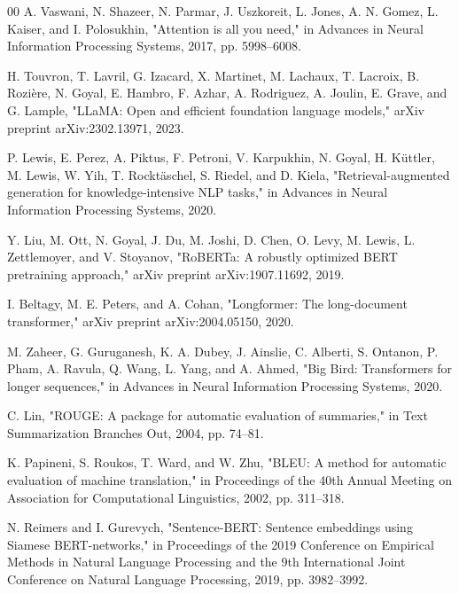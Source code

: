 \documentclass[conference]{IEEEtran}
\begin{document}
\begin{thebibliography}{00}
 A. Vaswani, N. Shazeer, N. Parmar, J. Uszkoreit, L. Jones, A. N. Gomez, L. Kaiser, and I. Polosukhin, "Attention is all you need," in Advances in Neural Information Processing Systems, 2017, pp. 5998–6008.

 H. Touvron, T. Lavril, G. Izacard, X. Martinet, M. Lachaux, T. Lacroix, B. Rozière, N. Goyal, E. Hambro, F. Azhar, A. Rodriguez, A. Joulin, E. Grave, and G. Lample, "LLaMA: Open and efficient foundation language models," arXiv preprint arXiv:2302.13971, 2023.

 P. Lewis, E. Perez, A. Piktus, F. Petroni, V. Karpukhin, N. Goyal, H. Küttler, M. Lewis, W. Yih, T. Rocktäschel, S. Riedel, and D. Kiela, "Retrieval-augmented generation for knowledge-intensive NLP tasks," in Advances in Neural Information Processing Systems, 2020.

 Y. Liu, M. Ott, N. Goyal, J. Du, M. Joshi, D. Chen, O. Levy, M. Lewis, L. Zettlemoyer, and V. Stoyanov, "RoBERTa: A robustly optimized BERT pretraining approach," arXiv preprint arXiv:1907.11692, 2019.

 I. Beltagy, M. E. Peters, and A. Cohan, "Longformer: The long-document transformer," arXiv preprint arXiv:2004.05150, 2020.

 M. Zaheer, G. Guruganesh, K. A. Dubey, J. Ainslie, C. Alberti, S. Ontanon, P. Pham, A. Ravula, Q. Wang, L. Yang, and A. Ahmed, "Big Bird: Transformers for longer sequences," in Advances in Neural Information Processing Systems, 2020.

 C. Lin, "ROUGE: A package for automatic evaluation of summaries," in Text Summarization Branches Out, 2004, pp. 74–81.

 K. Papineni, S. Roukos, T. Ward, and W. Zhu, "BLEU: A method for automatic evaluation of machine translation," in Proceedings of the 40th Annual Meeting on Association for Computational Linguistics, 2002, pp. 311–318.

 N. Reimers and I. Gurevych, "Sentence-BERT: Sentence embeddings using Siamese BERT-networks," in Proceedings of the 2019 Conference on Empirical Methods in Natural Language Processing and the 9th International Joint Conference on Natural Language Processing, 2019, pp. 3982–3992.
\end{thebibliography}
\end{document}
